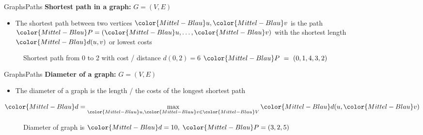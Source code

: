 \begin{frame}{Graphs}{Paths}
  \textbf{Shortest path in a graph:}
  {\color{Mittel-Blau}$G = (V , E)$}
  \begin{itemize}
    \item<2->
      The {\color{Mittel-Blau}shortest path} between two vertices
      ${\color{Mittel-Blau}u}, {\color{Mittel-Blau}v}$ is the path
      \begin{math}
        {\color{Mittel-Blau}P}
          = ({\color{Mittel-Blau}u}, \dots, {\color{Mittel-Blau}v})
      \end{math}
      with the shortest length ${\color{Mittel-Blau}d(u,v)}$ or lowest costs
  \end{itemize}
  \begin{figure}
    \begin{adjustbox}{width=0.75\linewidth}
      
    \end{adjustbox}
    \caption{{\color{Mittel-Blau}Shortest path} from 0 to 2 with cost / distance
      {\color{Mittel-Blau}$d(0,2) = 6$}
      ${\color{Mittel-Blau}P}~=~(0, 1, 4, 3, 2)$}
    \label{fig:graphs:shortest_path}
  \end{figure}
\end{frame}


\begin{frame}{Graphs}{Paths}
  \textbf{Diameter of a graph:}
  {\color{Mittel-Blau}$G = (V , E)$}
  \begin{itemize}
    \item<2->
      The {\color{Mittel-Blau}diameter} of a graph is the length / the costs of
      the {\color{Mittel-Blau}longest shortest path}
  \end{itemize}
  \vspace{-0.5em}
  \hfill\begin{math}
    \displaystyle
    {\color{Mittel-Blau}d} =
      \max\limits_{{\color{Mittel-Blau}u}, {\color{Mittel-Blau}v}
        \in {\color{Mittel-Blau}V}}
      {\color{Mittel-Blau}d(u, \color{Mittel-Blau}v)}
  \end{math}
  \begin{figure}
    \begin{adjustbox}{width=0.75\linewidth}
      
    \end{adjustbox}
    \caption{{\color{Mittel-Blau}Diameter} of graph is
      ${\color{Mittel-Blau}d} = 10, \; {\color{Mittel-Blau}P} = (3,2,5)$}
    \label{fig:graphs:diameter}
  \end{figure}
\end{frame}

